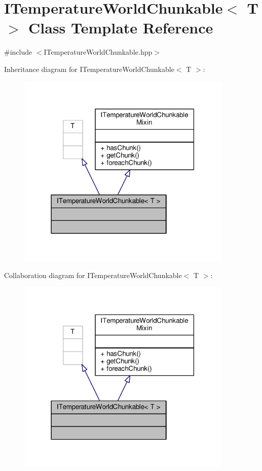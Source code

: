 \hypertarget{class_i_temperature_world_chunkable}{\section{I\-Temperature\-World\-Chunkable$<$ T $>$ Class Template Reference}
\label{class_i_temperature_world_chunkable}
}


{\ttfamily \#include $<$I\-Temperature\-World\-Chunkable.\-hpp$>$}



Inheritance diagram for I\-Temperature\-World\-Chunkable$<$ T $>$\-:
\nopagebreak
\begin{figure}[H]
\begin{center}
\leavevmode
\includegraphics[width=291pt]{class_i_temperature_world_chunkable__inherit__graph}
\end{center}
\end{figure}


Collaboration diagram for I\-Temperature\-World\-Chunkable$<$ T $>$\-:
\nopagebreak
\begin{figure}[H]
\begin{center}
\leavevmode
\includegraphics[width=291pt]{class_i_temperature_world_chunkable__coll__graph}
\end{center}
\end{figure}
